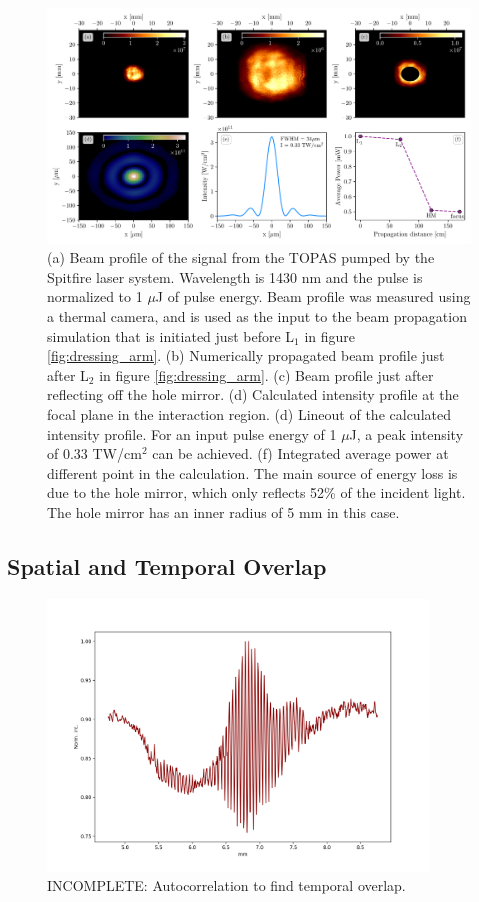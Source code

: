 \begin{figure}%
	\includegraphics[width=\textwidth]{figures/Beamline/pump_intensity_profiles_1430nm_1uj.pdf}
	\caption{(a) Beam profile of the signal from the TOPAS pumped by the Spitfire laser system.  Wavelength is 1430 nm and the pulse is normalized to 1 $\mu$J of pulse energy.  Beam profile was measured using a thermal camera, and is used as the input to the beam propagation simulation that is initiated just before L$_1$ in figure \ref{fig:dressing_arm}. (b) Numerically propagated beam profile just after L$_2$ in figure \ref{fig:dressing_arm}. (c) Beam profile just after reflecting off the hole mirror.  (d) Calculated intensity profile at the focal plane in the interaction region. (d) Lineout of the calculated intensity profile.  For an input pulse energy of 1 $\mu$J, a peak intensity of 0.33 TW/cm$^2$ can be achieved.  (f) Integrated average power at different point in the calculation.  The main source of energy loss is due to the hole mirror, which only reflects 52\% of the incident light.  The hole mirror has an inner radius of 5 mm in this case.}
	\label{fig:dressing_intensity}
\end{figure}


\subsection{Spatial and Temporal Overlap}
\label{sec:temporal_overlap}

\begin{figure}
	\centering
	\includegraphics[width=0.9\textwidth]{figures/Beamline/Overlap_camera.png}
	\caption{INCOMPLETE: Autocorrelation to find temporal overlap.}
	\label{fig:fine_scan_temporal_overlap}
\end{figure}

